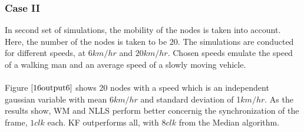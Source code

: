 \documentclass[a4paper,10pt]{report}
\begin{document}
\subsubsection{\textbf{Case II}}
In second set of simulations, the mobility of the nodes is taken into account. Here, the number of the nodes is taken to be $20$. The simulations are conducted for different speeds, at $6km/hr$ and $20km/hr$. Chosen speeds emulate the speed of a walking man and an average speed of a slowly moving vehicle.
\paragraph*{}
Figure $\ref{16output6}$ shows 20 nodes with a speed which is an independent gaussian variable with mean $6km/hr$ and standard deviation of 1$km/hr$. As the results show, WM and NLLS perform better concernig the synchronization of the frame, $1 clk$ each. KF outperforms all, with $8 clk$ from the Median algorithm.
\end{document}
